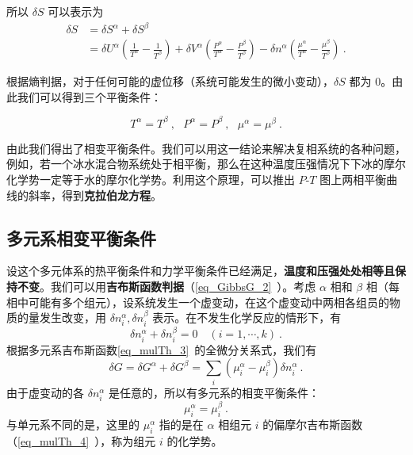 所以 $\delta S$ 可以表示为
\begin{equation}
\begin{aligned}
\delta S
&=\delta S^\alpha+\delta S^\beta\\
&=\delta U^\alpha\left(\frac{1}{T^\alpha}-\frac{1}{T^\beta}\right)+\delta V^\alpha\left(\frac{P^\alpha}{T^\alpha}-\frac{P^\beta}{T^\beta}\right)
-\delta n^\alpha\left(\frac{\mu^\alpha}{T^\alpha}-\frac{\mu^\beta}{T^\beta}\right)~.
\end{aligned}
\end{equation}

根据熵判据，对于任何可能的虚位移（系统可能发生的微小变动），$\delta S$ 都为 $0$。由此我们可以得到三个平衡条件：

\begin{equation}\label{eq_PhEquv_3}
T^\alpha=T^\beta~,\ \ \ P^\alpha=P^\beta~,\ \ \ \mu^\alpha=\mu^\beta~.
\end{equation}

由此我们得出了相变平衡条件。我们可以用这一结论来解决复相系统的各种问题，例如，若一个冰水混合物系统处于相平衡，那么在这种温度压强情况下下冰的摩尔化学势一定等于水的摩尔化学势。利用这个原理，可以推出 $P$-$T$ 图上两相平衡曲线的斜率，得到\textbf{克拉伯龙方程}。

\subsection{多元系相变平衡条件}

设这个多元体系的热平衡条件和力学平衡条件已经满足，\textbf{温度和压强处处相等且保持不变}。我们可以用\textbf{吉布斯函数判据}（\autoref{eq_GibbsG_2}~）。考虑 $\alpha$ 相和 $\beta$ 相（每相中可能有多个组元），设系统发生一个虚变动，在这个虚变动中两相各组员的物质的量发生改变，用 $\delta n_i^\alpha,\delta n_i^\beta$ 表示。在不发生化学反应的情形下，有
\begin{equation}
\delta n_i^\alpha+\delta n_i^\beta=0 \quad(i=1,\cdots,k)~.
\end{equation}
根据多元系吉布斯函数\autoref{eq_mulTh_3}~的全微分关系式，我们有
\begin{equation}
\delta G=\delta G^\alpha+\delta G^\beta=\sum_i (\mu_i^\alpha-\mu_i^\beta)\delta n_i^\alpha~.
\end{equation}
由于虚变动的各 $\delta n_i^\alpha$ 是任意的，所以有多元系的相变平衡条件：
\begin{equation}
\mu_i^\alpha=\mu_i^\beta~.
\end{equation}
与单元系不同的是，这里的 $\mu_i^\alpha$ 指的是在 $\alpha$ 相组元 $i$ 的偏摩尔吉布斯函数（\autoref{eq_mulTh_4}~），称为组元 $i$ 的化学势。

